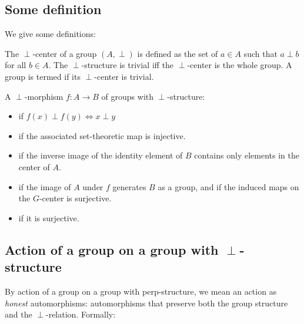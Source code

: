 \documentclass[a4paper]{amsart}
\begin{document}
\subsection{Some definition}

We give some definitions:

\begin{definer}
  The $\perp$-center of a group $(A,\perp)$ is defined as the set of
  $a \in A$ such that $a \perp b$ for all $b \in A$. The
  $\perp$-structure is trivial iff the $\perp$-center is the whole
  group. A group is termed 
  if its $\perp$-center is trivial.
\end{definer}

\begin{definer}\label{morphprops}
  A $\perp$-morphism $f:A \to B$ of groups with $\perp$-structure:

  \begin{itemize}

  \item {} if $f(x) \perp f(y) \iff
    x \perp y$

  \item {} if the associated
    set-theoretic map is injective.

  \item {} if the inverse image of
    the identity element of $B$ contains only elements in the center
    of $A$.

  \item {} if the image of $A$
    under $f$ generates $B$ as a group, and if the induced maps on the
    $G$-center is surjective.

  \item {} if it is surjective.
  \end{itemize}

\end{definer}


\subsection{Action of a group on a group with $\perp$-structure}

By action of a group on a group with perp-structure, we mean an action
as {\em honest} automorphisms: automorphisms that preserve both the
group structure and the $\perp$-relation. Formally:
\end{document}
